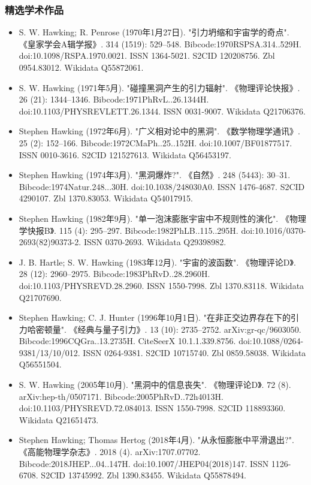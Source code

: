 \subsubsection{精选学术作品}
\begin{itemize}
\item S. W. Hawking; R. Penrose (1970年1月27日). "引力坍缩和宇宙学的奇点". 《皇家学会A辑学报》. 314 (1519): 529–548. Bibcode:1970RSPSA.314..529H. doi:10.1098/RSPA.1970.0021. ISSN 1364-5021. S2CID 120208756. Zbl 0954.83012. Wikidata Q55872061.  
\item S. W. Hawking (1971年5月). "碰撞黑洞产生的引力辐射". 《物理评论快报》. 26 (21): 1344–1346. Bibcode:1971PhRvL..26.1344H. doi:10.1103/PHYSREVLETT.26.1344. ISSN 0031-9007. Wikidata Q21706376.  
\item Stephen Hawking (1972年6月). "广义相对论中的黑洞". 《数学物理学通讯》. 25 (2): 152–166. Bibcode:1972CMaPh..25..152H. doi:10.1007/BF01877517. ISSN 0010-3616. S2CID 121527613. Wikidata Q56453197.  
\item Stephen Hawking (1974年3月). "黑洞爆炸?". 《自然》. 248 (5443): 30–31. Bibcode:1974Natur.248...30H. doi:10.1038/248030A0. ISSN 1476-4687. S2CID 4290107. Zbl 1370.83053. Wikidata Q54017915.  
\item Stephen Hawking (1982年9月). "单一泡沫膨胀宇宙中不规则性的演化". 《物理学快报B》. 115 (4): 295–297. Bibcode:1982PhLB..115..295H. doi:10.1016/0370-2693(82)90373-2. ISSN 0370-2693. Wikidata Q29398982.  
\item J. B. Hartle; S. W. Hawking (1983年12月). "宇宙的波函数". 《物理评论D》. 28 (12): 2960–2975. Bibcode:1983PhRvD..28.2960H. doi:10.1103/PHYSREVD.28.2960. ISSN 1550-7998. Zbl 1370.83118. Wikidata Q21707690.  
\item Stephen Hawking; C. J. Hunter (1996年10月1日). "在非正交边界存在下的引力哈密顿量". 《经典与量子引力》. 13 (10): 2735–2752. arXiv:gr-qc/9603050. Bibcode:1996CQGra..13.2735H. CiteSeerX 10.1.1.339.8756. doi:10.1088/0264-9381/13/10/012. ISSN 0264-9381. S2CID 10715740. Zbl 0859.58038. Wikidata Q56551504.  
\item S. W. Hawking (2005年10月). "黑洞中的信息丧失". 《物理评论D》. 72 (8). arXiv:hep-th/0507171. Bibcode:2005PhRvD..72h4013H. doi:10.1103/PHYSREVD.72.084013. ISSN 1550-7998. S2CID 118893360. Wikidata Q21651473.  
\item Stephen Hawking; Thomas Hertog (2018年4月). "从永恒膨胀中平滑退出?". 《高能物理学杂志》. 2018 (4). arXiv:1707.07702. Bibcode:2018JHEP...04..147H. doi:10.1007/JHEP04(2018)147. ISSN 1126-6708. S2CID 13745992. Zbl 1390.83455. Wikidata Q55878494.  
\end{itemize}
